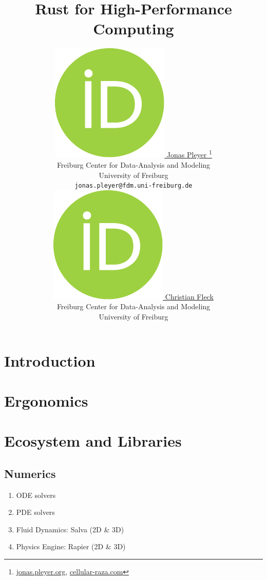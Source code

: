 \documentclass{article}
\title{Rust for High-Performance Computing}
\author{
    \href{https://orcid.org/0009-0001-0613-7978}{
        \includegraphics[scale=0.06]{orcid.pdf}
        \hspace{1mm}Jonas Pleyer
    }
    \thanks{
        \href{https://jonas.pleyer.org}{jonas.pleyer.org},
        \href{https://cellular-raza.com}{cellular-raza.com}
    }\\
	Freiburg Center for Data-Analysis and Modeling\\
	University of Freiburg\\
	\texttt{jonas.pleyer@fdm.uni-freiburg.de} \\
	\And
	\href{https://orcid.org/0000-0002-6371-4495}{
        \includegraphics[scale=0.06]{orcid.pdf}
        \hspace{1mm}Christian Fleck
    }\\
	Freiburg Center for Data-Analysis and Modeling\\
	University of Freiburg
}
\begin{document}
\maketitle

\begin{abstract}
\end{abstract}



\section{Introduction}
\label{section:introduction}

\section{Ergonomics }
\label{section:debugging}

\section{Ecosystem and Libraries}

\subsection{Numerics}
\label{subsection:numerics}

\begin{enumerate}
    \item ODE solvers~\cite{Renevey2024}
    \item PDE solvers
    \item Fluid Dynamics: Salva (2D \& 3D)~\cite{Crozet2024}
    \item Physics Engine: Rapier (2D \& 3D)~\cite{Crozet2025}
\end{enumerate}

\end{document}
